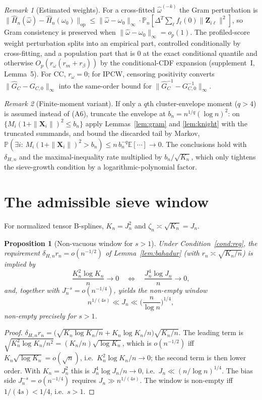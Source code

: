 \documentclass[11pt]{article}
\newtheorem{proposition}{Proposition}
\theoremstyle{remark}\newtheorem{remark}{Remark}
\newcommand{\E}{\mathbb{E}}
\newcommand{\PR}{\mathbb{P}}
\newcommand{\Pn}{\mathbb{P}_n}
\newcommand{\X}{\bm{X}}
\newcommand{\Z}{\bm{Z}}
\newcommand{\op}{\mathrm{op}}
\begin{document}
\begin{remark}[Estimated weights]\label{rem:weights}
For a cross-fitted $\widehat\omega^{(-k)}$ the Gram perturbation is
$\|\widehat H_n(\widehat\omega)-\widehat H_n(\omega_0)\|_\op\le
\|\widehat\omega-\omega_0\|_\infty\cdot\Pn[\Delta^T\sum_\ell f_\ell(0)
\|\Z_{i\ell}\|^2]$, so Gram consistency is preserved when
$\|\widehat\omega-\omega_0\|_\infty=o_p(1)$. The profiled-score weight
perturbation splits into an empirical part, controlled conditionally by
cross-fitting, and a population part that is $0$ at the exact conditional
quantile and otherwise $O_p(r_\omega(r_m+r_\beta))$ by the conditional-CDF
expansion (supplement~I, Lemma~5). For CC, $r_\omega=0$; for IPCW, censoring
positivity converts $\|\widehat G_C-G_{C,0}\|_\infty$ into the same-order bound
for $\|\widehat G_C^{-1}-G_{C,0}^{-1}\|_\infty$.
\end{remark}

\begin{remark}[Finite-moment variant]\label{rem:moment}
If only a $q$th cluster-envelope moment ($q>4$) is assumed instead of (A6),
truncate the envelope at $b_n=n^{1/q}(\log n)^2$: on $\{M_i(1+\|\X_i\|)^2\le
b_n\}$ apply Lemmas~\ref{lem:gram} and \ref{lem:knight} with the truncated
summands, and bound the discarded tail by Markov, $\PR(\exists i:\,
M_i(1+\|\X_i\|)^2>b_n)\le n\,b_n^{-q}\E[\cdots]\to0$. The conclusions hold with
$\delta_{H,n}$ and the maximal-inequality rate multiplied by $b_n/\sqrt{K_n}$,
which only tightens the sieve-growth condition by a logarithmic-polynomial
factor.
\end{remark}

\section{The admissible sieve window}\label{sec:window}
For normalized tensor B-splines, $K_n=J_n^2$ and $\zeta_n\asymp\sqrt{K_n}=J_n$.
\begin{proposition}[Non-vacuous window for $s>1$]\label{prop:window}
Under Condition~\ref{cond:reg}, the requirement $\delta_{H,n}r_n=o(n^{-1/2})$ of
Lemma~\ref{lem:bahadur} (with $r_n\asymp\sqrt{K_n/n}$) is implied by
\[
\frac{K_n^2\log K_n}{n}\to0\quad\Longleftrightarrow\quad
\frac{J_n^4\log J_n}{n}\to0,
\]
and, together with $J_n^{-s}=o(n^{-1/4})$, yields the non-empty window
\[
n^{1/(4s)}\ll J_n\ll\Big(\frac{n}{\log n}\Big)^{1/4},
\]
non-empty precisely for $s>1$.
\end{proposition}
\begin{proof}
$\delta_{H,n}r_n=\big(\sqrt{K_n\log K_n/n}+K_n\log K_n/n\big)\sqrt{K_n/n}$. The
leading term is $\sqrt{K_n^2\log K_n/n^2}=(K_n/n)\sqrt{\log K_n}$, which is
$o(n^{-1/2})$ iff $K_n\sqrt{\log K_n}=o(\sqrt n)$, i.e.\ $K_n^2\log K_n/n\to0$;
the second term is then lower order. With $K_n=J_n^2$ this is
$J_n^4\log J_n/n\to0$, i.e.\ $J_n\ll(n/\log n)^{1/4}$. The bias side
$J_n^{-s}=o(n^{-1/4})$ requires $J_n\gg n^{1/(4s)}$. The window is non-empty iff
$1/(4s)<1/4$, i.e.\ $s>1$.
\end{proof}
\end{document}
